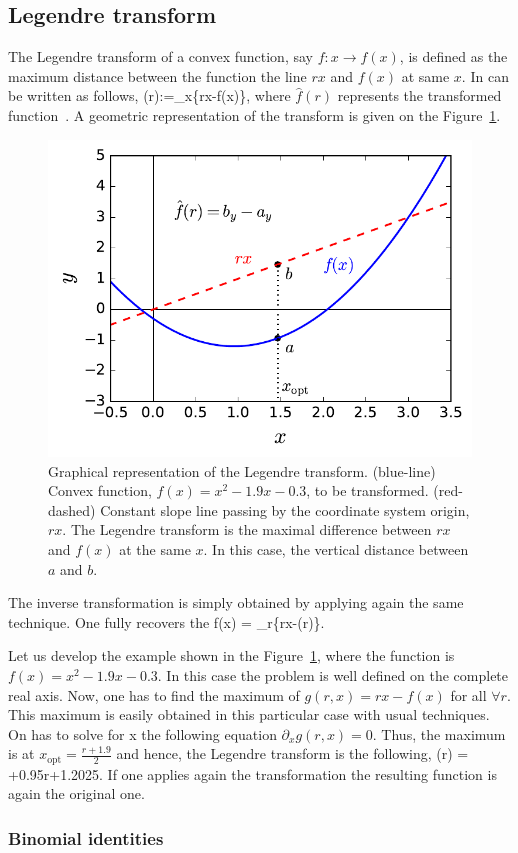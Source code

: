 \subsection{Legendre transform}
\label{app:legendre-transform}

The Legendre transform of a convex function, say $f:x \rightarrow f(x)$, is defined as the maximum distance between the function the line $rx$ and $f(x)$ at same $x$.
In can be written as follows,
\be
  (r):=\max_{x}\{rx-f(x)\},
\ee
where $\hat{f}(r)$ represents the transformed function~\citep{Rockafellar1996}.
A geometric representation of the transform is given on the Figure~\ref{fig:lt-geometric-legendre}.

\begin{figure}
  \centering
  \includegraphics[scale=.65]{img/plots/LT_legendre.pdf}
  \caption[Graphical representation of the Legendre trasnform.]{Graphical representation of the Legendre transform. (blue-line) Convex function, $f(x)=x^2-1.9x-0.3$, to be transformed. (red-dashed) Constant slope line passing by the coordinate system origin, $rx$. The Legendre transform is the maximal difference between $rx$ and $f(x)$ at the same $x$. In this case, the vertical distance between $a$ and $b$.}
  \label{fig:lt-geometric-legendre}
\end{figure}

The inverse transformation is simply obtained by applying again the same technique.
One fully recovers the
\be
  f(x) = \max_{r}\{rx-(r)\}.
\ee

Let us develop the example shown in the Figure~\ref{fig:lt-geometric-legendre}, where the function is $f(x)=x^2-1.9x-0.3$.
In this case the problem is well defined on the complete real axis.
Now, one has to find the maximum of $g(r,x)=rx-f(x)$ for all $\forall r$.
This maximum is easily obtained in this particular case with usual techniques.
On has to solve for x the following equation $\partial_x g(r,x) = 0$. Thus, the maximum is at $x_{\text{opt}} = \frac{r+1.9}{2}$ and hence, the Legendre transform is the following,
\be
  (r) = +0.95r+1.2025.
\ee
If one applies again the transformation the resulting function is again the original one.

\subsubsection{Binomial identities}
